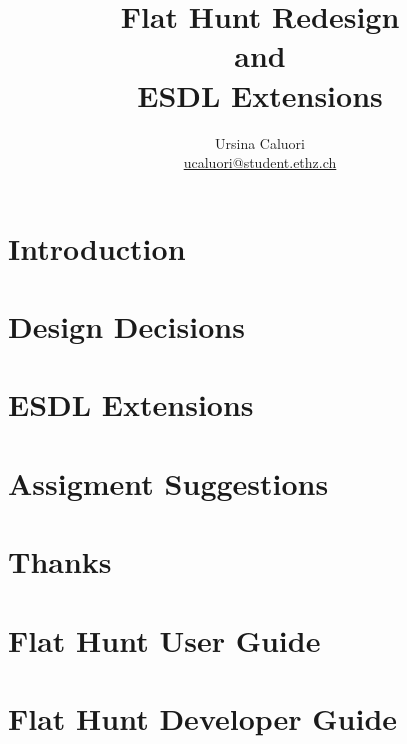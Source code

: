 \documentclass[a4paper,titlepage,12pt]{article}
\title{\textbf{Flat Hunt Redesign \\ and \\ ESDL Extensions}}
\author{Ursina Caluori\\ \href{mailto: ucaluori@student.ethz.ch}{ucaluori@student.ethz.ch}}
\begin{document}
  \maketitle

  \tableofcontents
  
  \pagebreak

  \section{Introduction}
    
  \section{Design Decisions}
    
  \section{\label{esdl_ext}ESDL Extensions}
    
  \section{\label{assignments}Assigment Suggestions}
    
  \section{Thanks}
        
  
  \hyperref[ref]{}
  
    
  \pagebreak
  
  \appendix
  \section{Flat Hunt User Guide}
  
  
  \pagebreak
  
  \section{Flat Hunt Developer Guide}
   
  
\end{document}
